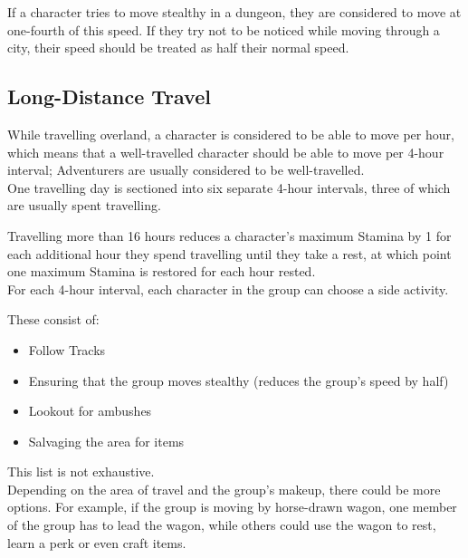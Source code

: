 If a character tries to move stealthy in a dungeon, they are considered to move at one-fourth of this speed.
If they try not to be noticed while moving through a city, their speed should be treated as half their normal speed.\\

\subsection{Long-Distance Travel}\label{subsec:longDistanceTravel}
While travelling overland, a character is considered to be able to move  per hour, which means that a well-travelled character should be able to move  per 4-hour interval;
Adventurers are usually considered to be well-travelled.\\

One travelling day is sectioned into six separate 4-hour intervals, three of which are usually spent travelling.

Travelling more than 16 hours reduces a character's maximum Stamina by 1 for each additional hour they spend travelling until they take a rest, at which point one maximum Stamina is restored for each hour rested.\\

For each 4-hour interval, each character in the group can choose a side activity.

These consist of:

\begin{itemize}
	\item Follow Tracks

	\item Ensuring that the group moves stealthy (reduces the group's speed by half)

	\item Lookout for ambushes

	\item Salvaging the area for items

\end{itemize}
This list is not exhaustive.\\

Depending on the area of travel and the group's makeup, there could be more options.
For example, if the group is moving by horse-drawn wagon, one member of the group has to lead the wagon, while others could use the wagon to rest, learn a perk or even craft items.

